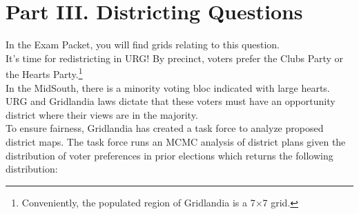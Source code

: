 \documentclass[12pt,addpoints]{exam}
\begin{document}
\clearpage

{
	 \thispagestyle{empty}

	}

\restoregeometry
\clearpage

\section*{Part III. Districting Questions}

	In the Exam Packet, you will find grids relating to this question.\\

	It's time for redistricting in URG! By precinct, voters prefer the Clubs Party or the Hearts Party.\footnote{Conveniently, the populated region of Gridlandia is a 7$\times$7 grid.}\\

	In the MidSouth, there is a minority voting bloc indicated with large hearts. URG and Gridlandia laws dictate that these voters must have an opportunity district where their views are in the majority.\\

	To ensure fairness, Gridlandia has created a task force to analyze proposed district maps. The task force runs an MCMC analysis of district plans given the distribution of voter preferences in prior elections which returns the following distribution:

\end{document}
